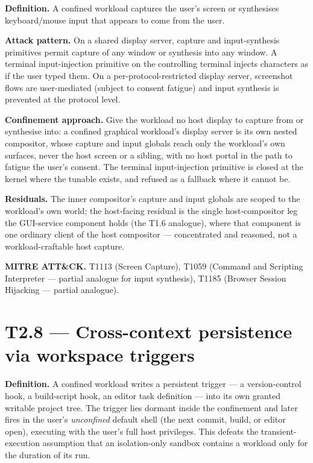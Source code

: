 \textbf{Definition.} A confined workload captures the user's screen or
synthesises keyboard/mouse input that appears to come from the user.

\textbf{Attack pattern.} On a shared display server, capture and
input-synthesis primitives permit capture of any window or synthesis
into any window. A terminal input-injection primitive on the controlling
terminal injects characters as if the user typed them. On a
per-protocol-restricted display server, screenshot flows are
user-mediated (subject to consent fatigue) and input synthesis is
prevented at the protocol level.

\textbf{Confinement approach.} Give the workload no host display to
capture from or synthesise into: a confined graphical workload's display
server is its own nested compositor, whose capture and input globals
reach only the workload's own surfaces, never the host screen or a
sibling, with no host portal in the path to fatigue the user's consent.
The terminal input-injection primitive is closed at the kernel where the
tunable exists, and refused as a fallback where it cannot be.

\textbf{Residuals.} The inner compositor's capture and input globals are
scoped to the workload's own world; the host-facing residual is the
single host-compositor leg the GUI-service component holds (the T1.6
analogue), where that component is one ordinary client of the host
compositor --- concentrated and reasoned, not a workload-craftable host
capture.

\textbf{MITRE ATT\&CK.} T1113 (Screen Capture), T1059 (Command and
Scripting Interpreter --- partial analogue for input synthesis), T1185
(Browser Session Hijacking --- partial analogue).

\hypertarget{t2.8-cross-context-persistence-via-workspace-triggers}{%
\section{T2.8 --- Cross-context persistence via workspace
triggers}\label{t2.8-cross-context-persistence-via-workspace-triggers}}

\textbf{Definition.} A confined workload writes a persistent trigger ---
a version-control hook, a build-script hook, an editor task definition
--- into its own granted writable project tree. The trigger lies dormant
inside the confinement and later fires in the user's \emph{unconfined}
default shell (the next commit, build, or editor open), executing with
the user's full host privileges. This defeats the transient-execution
assumption that an isolation-only sandbox contains a workload only for
the duration of its run.


